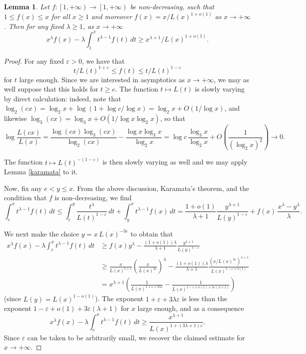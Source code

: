\documentclass[12pt,a4paper,oneside]{amsart}
\newtheorem{lemma}[theorem]{Lemma}
\begin{document}
\begin{lemma} \label{calculus}
Let $f:\left [1, +\infty \right ) \rightarrow \left [ 1, +\infty \right )$ be non-decreasing, such that $1 \leq  f(x) \leq x$ for all $x \geq 1$ and moreover $f(x) = x/L(x)^{1+o(1)}$ as $x \to +\infty$. Then for any fixed $\lambda \geq 1$, as $x \to +\infty$
\[x^\lambda f(x) - \lambda \int_1^x t^{\lambda-1} f(t) \, dt \ge x^{\lambda+1} /L(x)^{1+o(1)}. \]
\end{lemma}
\begin{proof}

For any fixed $\varepsilon>0$, we have that \[  t/L(t)^{1+\varepsilon} \le f(t) \le t/L(t)^{1-\varepsilon}  \] for $t$ large enough. Since we are interested in asymptotics as $x \to +\infty$, we may as well suppose that this holds for $t \ge e$. The function $t \mapsto L(t)$ is slowly varying by direct calculation: indeed, note that $\log_2(cx)=\log_2 x+\log(1+\log c/\log x) = \log_2 x+O(1/\log x)$, and likewise $\log_3(cx) =\log_3 x+O(1/\log x \log_2 x)$, so that
\[
\log \frac{L(cx)}{L(x)} =\frac{\log(cx) \log_3(cx)}{\log_2(cx)}-\frac{\log x \log_3 x}{\log_2 x} = \log c\, \frac{\log_3 x}{\log_2 x} + O\left ( \frac{1}{(\log_2 x)^2} \right ) \rightarrow 0.\]

The function $t \mapsto L(t)^{-(1-\varepsilon)}$ is then slowly varying as well \cite[Prop. 1.3.6(ii)]{BGT87} and we may apply Lemma \ref{karamata} to it. 

Now, fix any $e < y \le x$. From the above discussion, Karamata's theorem, and the condition that $f$ is non-decreasing, we find
\[ \int_e^x  t^{\lambda-1} f(t) \, dt \leq \int_e^y \frac{t^\lambda}{L(t)^{1-\varepsilon}} \,dt + \int_y^x t^{\lambda-1} f(x)\, dt = \frac{1+o(1)}{\lambda+1}\frac{y^{\lambda+1}}{L(y)^{1-\varepsilon}}+f(x)\,\frac{x^\lambda-y^\lambda}{\lambda}
.\]

We next make the choice $y=x\,L(x)^{-3\varepsilon}$ to obtain that
\begin{align*} x^\lambda f(x) - \lambda \int_e^x t^{\lambda-1} f(t) \, dt &\ge  f(x) y^\lambda-\frac{(1+o(1))\lambda}{\lambda+1}\frac{y^{\lambda+1}}{L(y)^{1-\varepsilon}}
\\ &\ge \frac{x}{L(x)^{1+\varepsilon}} \left ( \frac{x}{L(x)^{3\varepsilon}}\right )^\lambda- \frac{(1+o(1))\lambda}{\lambda+1}\frac{(x/L(x)^{3\varepsilon})^{\lambda+1}}{L(x)^{1-\varepsilon+o(1)}}
\\ & = x^{\lambda+1} \left ( \frac{1}{L(x)^{1+\varepsilon+3\lambda\varepsilon}} - \frac{1}{L(x)^{1-\varepsilon+o(1)+3\varepsilon(\lambda+1)}}   \right )
\end{align*} 
(since $L(y)=L(x)^{1-o(1)}$). The exponent $1+\varepsilon+3\lambda\varepsilon$ is less than the exponent $1-\varepsilon+o(1)+3\varepsilon(\lambda+1)$ for $x$ large enough, and as a consequence \[ x^\lambda f(x) - \lambda \int_e^x t^{\lambda-1} f(t) \, dt \ge \frac{x^{\lambda+1}}{L(x)^{1+(3\lambda+1)\varepsilon}}. \]
Since $\varepsilon$ can be taken to be arbitrarily small, we recover the claimed estimate for $x \to +\infty$.

\end{proof}
\end{document}

